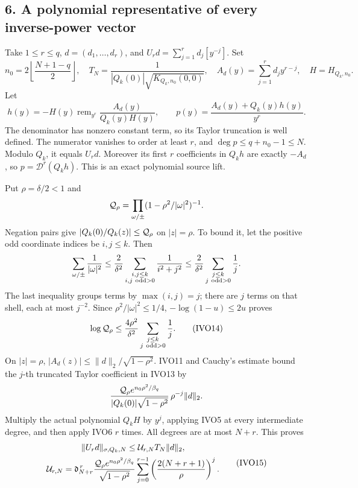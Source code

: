 \subsection{6. A polynomial representative of every inverse-power vector}\label{a-polynomial-representative-of-every-inverse-power-vector}

Take \(1\le r\le q\), \(d=(d_1,\ldots,d_r)\), and \(U_rd=\sum_{j=1}^rd_j[y^{-j}]\). Set \[
n_0=2\left\lfloor\frac{N+1-q}{2}\right\rfloor,\quad
T_N=\frac1{|Q_k(0)|\sqrt{K_{Q_k,n_0}(0,0)}},\quad
A_d(y)=\sum_{j=1}^rd_jy^{r-j},\quad H=H_{Q_k,n_0}.
\] Let \[
h(y)=-H(y)\operatorname{rem}_{y^r}\frac{A_d(y)}{Q_k(y)H(y)},\qquad
p(y)=\frac{A_d(y)+Q_k(y)h(y)}{y^r}.
\tag{IVO13}
\] The denominator has nonzero constant term, so its Taylor truncation is well defined. The numerator vanishes to order at least \(r\), and \(\deg p\le q+n_0-1\le N\). Modulo \(Q_k\), it equals \(U_rd\). Moreover its first \(r\) coefficients in \(Q_kh\) are exactly \(-A_d\), so \(p={\mathscr D}^r(Q_kh)\). This is an exact polynomial source lift.

Put \(\rho=\delta/2<1\) and \[
{\cal Q}_\rho=\prod_{\omega/\pm}
(1-\rho^2/|\omega|^2)^{-1}.
\] Negation pairs give \(|Q_k(0)/Q_k(z)|\le{\cal Q}_\rho\) on \(|z|=\rho\). To bound it, let the positive odd coordinate indices be \(i,j\le k\). Then \[
\sum_{\omega/\pm}\frac1{|\omega|^2}
\le\frac2{\delta^2}\sum_{\substack{i,j\le k\\i,j\ {\rm odd}>0}}\frac1{i^2+j^2}
\le\frac2{\delta^2}\sum_{\substack{j\le k\\j\ {\rm odd}>0}}\frac1j.
\] The last inequality groups terms by \(\max(i,j)=j\); there are \(j\) terms on that shell, each at most \(j^{-2}\). Since \(\rho^2/|\omega|^2\le1/4\), \(-\log(1-u)\le2u\) proves \[
\log{\cal Q}_\rho\le
\frac{4\rho^2}{\delta^2}\sum_{\substack{j\le k\\j\ {\rm odd}>0}}\frac1j.
\tag{IVO14}
\] On \(|z|=\rho\), \(|A_d(z)|\le\|d\|_2/\sqrt{1-\rho^2}\). IVO11 and Cauchy's estimate bound the \(j\)-th truncated Taylor coefficient in IVO13 by \[
\frac{{\cal Q}_\rho e^{n_0\rho^2/\beta_q}}
{|Q_k(0)|\sqrt{1-\rho^2}}\,\rho^{-j}\|d\|_2.
\] Multiply the actual polynomial \(Q_kH\) by \(y^j\), applying IVO5 at every intermediate degree, and then apply IVO6 \(r\) times. All degrees are at most \(N+r\). This proves \[
\begin{gathered}
\|U_rd\|_{\sigma,Q_k,N}\le{\cal U}_{r,N}T_N\|d\|_2,\\
{\cal U}_{r,N}=
\mathfrak d_{N+r}^{\,r}
\frac{{\cal Q}_\rho e^{n_0\rho^2/\beta_q}}{\sqrt{1-\rho^2}}
\sum_{j=0}^{r-1}\left(\frac{2(N+r+1)}{\rho}\right)^j.
\end{gathered}\tag{IVO15}
\]

